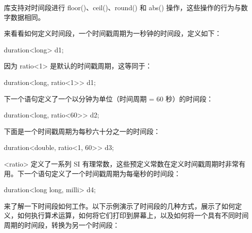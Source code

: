 库支持对时间段进行 floor()、ceil()、round() 和 abs() 操作，这些操作的行为与数字数据相同。

来看看如何定义时间段，一个时间戳周期为一秒钟的时间段，定义如下：

\begin{cpp}
duration<long> d1;
\end{cpp}

因为 ratio<1> 是默认的时间戳周期，这等同于：

\begin{cpp}
duration<long, ratio<1>> d1;
\end{cpp}

下一个语句定义了一个以分钟为单位（时间周期 = 60 秒）的时间段：

\begin{cpp}
duration<long, ratio<60>> d2;
\end{cpp}

下面是一个时间戳周期为每秒六十分之一的时间段：

\begin{cpp}
duration<double, ratio<1, 60>> d3;
\end{cpp}

<ratio> 定义了一系列 SI 有理常数，这些预定义常数在定义时间戳周期时非常有用。下一个语句定义了一个时间戳周期为每毫秒的时间段：

\begin{cpp}
duration<long long, milli> d4;
\end{cpp}


来了解一下时间段如何工作。以下示例演示了时间段的几种方式，展示了如何定义，如何执行算术运算，如何将它们打印到屏幕上，以及如何将一个具有不同时间周期的时间段，转换为另一个时间段：

